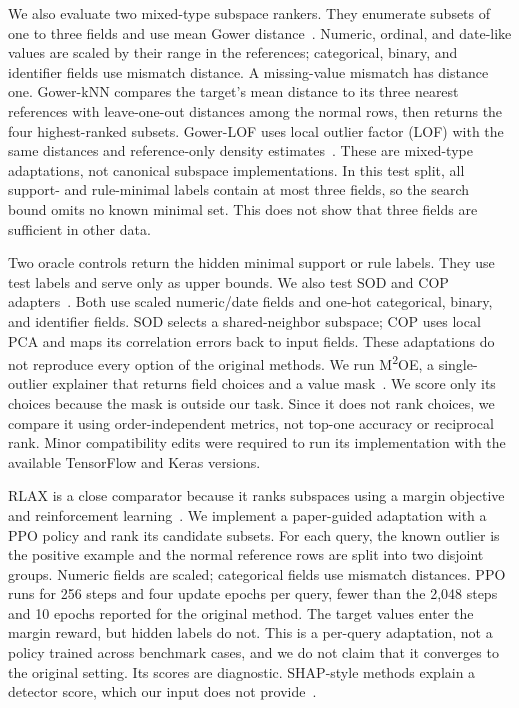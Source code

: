 \documentclass[conference]{IEEEtran}
\begin{document}
We also evaluate two mixed-type subspace rankers. They enumerate subsets of one to three fields and use mean Gower distance~\cite{gower1971similarity}. Numeric, ordinal, and date-like values are scaled by their range in the references; categorical, binary, and identifier fields use mismatch distance. A missing-value mismatch has distance one. Gower-kNN compares the target's mean distance to its three nearest references with leave-one-out distances among the normal rows, then returns the four highest-ranked subsets. Gower-LOF uses local outlier factor (LOF) with the same distances and reference-only density estimates~\cite{breunig2000lof}. These are mixed-type adaptations, not canonical subspace implementations. In this test split, all support- and rule-minimal labels contain at most three fields, so the search bound omits no known minimal set. This does not show that three fields are sufficient in other data.

Two oracle controls return the hidden minimal support or rule labels. They use test labels and serve only as upper bounds. We also test SOD and COP adapters~\cite{kriegel2009sod,kriegel2012cop}. Both use scaled numeric/date fields and one-hot categorical, binary, and identifier fields. SOD selects a shared-neighbor subspace; COP uses local PCA and maps its correlation errors back to input fields. These adaptations do not reproduce every option of the original methods. We run M\textsuperscript{2}OE, a single-outlier explainer that returns field choices and a value mask~\cite{angiulli2024m2oe}. We score only its choices because the mask is outside our task. Since it does not rank choices, we compare it using order-independent metrics, not top-one accuracy or reciprocal rank. Minor compatibility edits were required to run its implementation with the available TensorFlow and Keras versions.

RLAX is a close comparator because it ranks subspaces using a margin objective and reinforcement learning~\cite{amirato2026rlax}. We implement a paper-guided adaptation with a PPO policy and rank its candidate subsets. For each query, the known outlier is the positive example and the normal reference rows are split into two disjoint groups. Numeric fields are scaled; categorical fields use mismatch distances. PPO runs for 256 steps and four update epochs per query, fewer than the 2,048 steps and 10 epochs reported for the original method. The target values enter the margin reward, but hidden labels do not. This is a per-query adaptation, not a policy trained across benchmark cases, and we do not claim that it converges to the original setting. Its scores are diagnostic. SHAP-style methods explain a detector score, which our input does not provide~\cite{li2024xadsurvey}.
\end{document}
